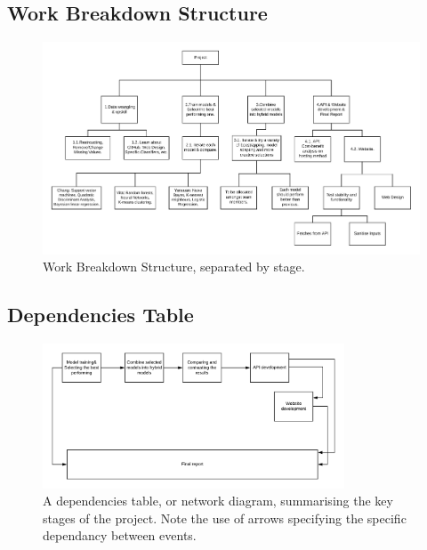 \documentclass[a4paper, 12pt]{article}
\begin{document}
\begin{landscape}
\subsection{Work Breakdown Structure}
\begin{figure}[h!]
    \centering
    \includegraphics[width=1.5\textwidth]{Work Breakdown.png}
    \caption{Work Breakdown Structure, separated by stage.}
    \label{fig:WBS}
\end{figure}
\end{landscape}

\subsection{Dependencies Table}
\begin{figure}[ht] 
    \centering
    \includegraphics[width=0.8\textwidth]{Dependencies Table.png}
    \caption{A dependencies table, or network diagram, summarising the key stages of the project. Note the use of arrows specifying the specific dependancy between events.}
    \label{fig:dependency}
\end{figure}
\end{document}

